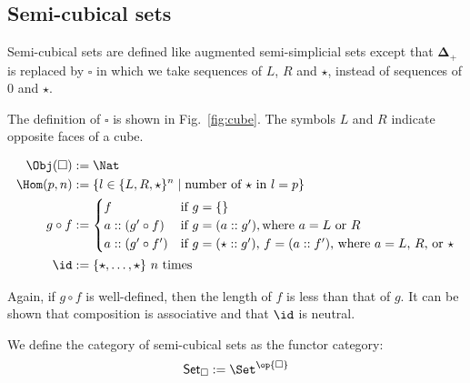 \documentclass[10pt]{art.cls/art}
\newcommand{\DeltaPlus}{\ensuremath{\boldsymbol{\Delta}_+}}
\newcommand{\Cube}{\ensuremath{\boldsymbol{\square}}}
\newcommand{\CSet}{\ensuremath{\mathsf{Set}_{\boldsymbol{\square}}}}
\newcommand{\kstar}{{\star}}
\begin{document}
\subsection{Semi-cubical sets}
Semi-cubical sets are defined like augmented semi-simplicial sets except that $\DeltaPlus$ is replaced by $\Cube$ in which we take sequences of $L$, $R$ and $\star$, instead of sequences of $0$ and $\kstar$.

\begin{definition}[\Cube]
  The definition of $\Cube$ is shown in Fig.~\ref{fig:cube}. The symbols $L$ and $R$ indicate opposite faces of a cube.
  \begin{figure*}[!t]
    \begin{align*}
      \Obj(\Cube) & := \Nat                                                                                \\
      \Hom(p, n)  & := \{l \in \{L, R, \kstar\}^n \mid \text{number of $\kstar$ in $l = p$}\}              \\
      g \circ f   & :=
      \begin{cases}
        f                  & \text{if $g = \{\}$}                                                            \\
        a :: (g' \circ f)  & \text{if $g = (a :: g')$}, \text{where $a = L$ or $R$}                          \\
        a :: (g' \circ f') & \text{if $g = (\star :: g')$, $f = (a :: f')$, where $a = L$, $R$, or $\kstar$} \\
      \end{cases} \\
      \id         & := \{\kstar, \ldots, \kstar\} \text{ $n$ times}
    \end{align*}
    \caption{Definition of \Cube}\label{fig:cube}
  \end{figure*}

  Again, if $g \circ f$ is well-defined, then the length of $f$ is less than that of $g$. It can be shown that composition is associative and that $\id$ is neutral.
\end{definition}

\begin{definition}[\CSet]
  We define the category of semi-cubical sets as the functor category:
  \begin{equation*}
    \CSet := \Set^{\op{\Cube}}
  \end{equation*}
\end{definition}
\end{document}

